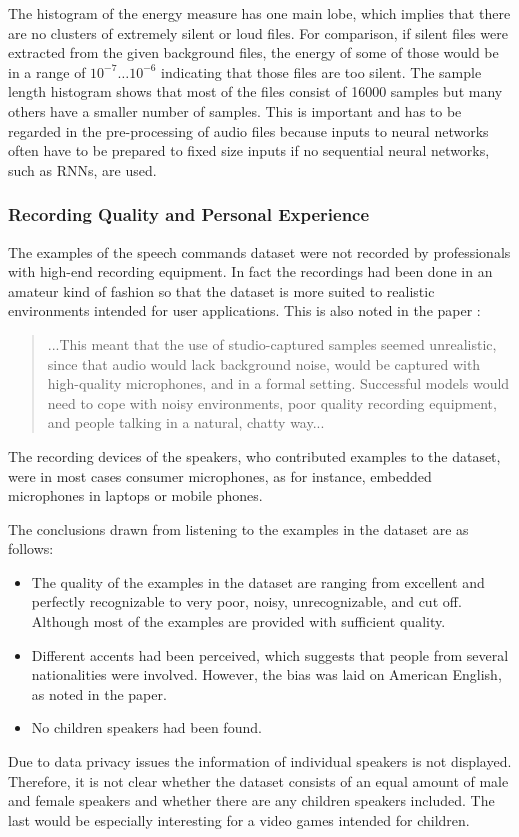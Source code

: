 \FloatBarrier
\noindent
The histogram of the energy measure has one main lobe, which implies that there are no clusters of extremely silent or loud files.
For comparison, if silent files were extracted from the given background files, the energy of some of those would be in a range of $10^{-7} \dots 10^{-6}$ indicating that those files are too silent.
The sample length histogram shows that most of the files consist of 16000 samples but many others have a smaller number of samples. 
This is important and has to be regarded in the pre-processing of audio files because inputs to neural networks often have to be prepared to fixed size inputs if no sequential neural networks, such as RNNs, are used.



\subsubsection{Recording Quality and Personal Experience}
The examples of the speech commands dataset \cite{Warden2018} were not recorded by professionals with high-end recording equipment.
In fact the recordings had been done in an amateur kind of fashion so that the dataset is more suited to realistic environments intended for user applications.
This is also noted in the paper \cite{Warden2018}:
\begin{quote}
...This meant that the use of studio-captured samples seemed unrealistic, since that audio would lack background noise, would be captured with high-quality microphones, and in a formal setting. 
Successful models would need to cope with noisy environments, poor quality recording equipment, and people talking in a natural, chatty way...
\end{quote}
The recording devices of the speakers, who contributed examples to the dataset, were in most cases consumer microphones, as for instance, embedded microphones in laptops or mobile phones.

The conclusions drawn from listening to the examples in the dataset are as follows:
\begin{itemize}
  \item The quality of the examples in the dataset are ranging from excellent and perfectly recognizable to very poor, noisy, unrecognizable, and cut off. Although most of the examples are provided with sufficient quality.
  \item Different accents had been perceived, which suggests that people from several nationalities were involved.
  However, the bias was laid on American English, as noted in the paper.
  \item No children speakers had been found.
\end{itemize}
Due to data privacy issues the information of individual speakers is not displayed.
Therefore, it is not clear whether the dataset consists of an equal amount of male and female speakers and whether there are any children speakers included.
The last would be especially interesting for a video games intended for children.

